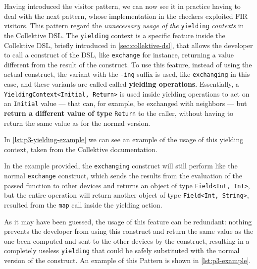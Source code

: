 \documentclass[12pt,a4paper,openright,twoside]{book}
\begin{document}
Having introduced the visitor pattern, we can now see it in practice having 
to deal with the next pattern, whose implementation in the checkers exploited
\ac{FIR} visitors. This pattern regard the \emph{unnecessary usage of the} 
\lstinline{yielding} \emph{contexts} in the Collektive DSL. 
%
The \lstinline{yielding} context is a specific feature inside the Collektive
\ac{DSL}, briefly introduced in \cref{sec:collektive-dsl}, that allows the
developer to call a construct of the \ac{DSL}, like \lstinline{exchange} for
instance, returning a value different from the result of the construct. To use
this feature, instead of using the actual construct, the variant with the
\lstinline{-ing} suffix is used, like \lstinline{exchanging} in this case, and
these variants are called called \textbf{yielding operations}. 
%
Essentially, a \lstinline{YieldingContext<Initial, Return>} is used inside
yielding operations to act on an \lstinline{Initial} value --- that can, for
example, be exchanged with neighbors --- but \textbf{return a different value of
type} \lstinline{Return} to the caller, without having to return the same value
as for the normal version.

In \cref{lst:p3-yielding-example} we can see an example of the usage of this
yielding context, taken from the Collektive documentation. 



In the example provided, the \lstinline{exchanging} construct will still perform
like the normal \lstinline{exchange} construct, which sends the results from the
evaluation of the passed function to other devices and returns an object of type
\lstinline{Field<Int, Int>}, but the entire operation will return another object
of type \lstinline{Field<Int, String>}, resulted from the \lstinline{map} call
inside the yielding action.

As it may have been guessed, the usage of this feature can be redundant: nothing
prevents the developer from using this construct and return the same value as the
one been computed and sent to the other devices by the construct, resulting in a 
completely useless \lstinline{yielding} that could be safely substituted with the
normal version of the construct. 
%
An example of this Pattern is shown in \cref{lst:p3-example}.


\end{document}

